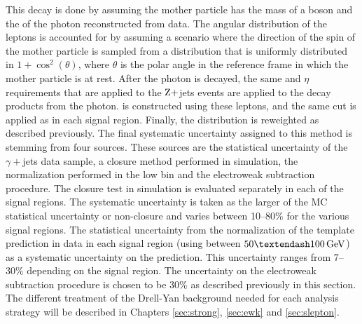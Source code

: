 This decay is done by assuming the mother particle has the mass of a \PZ boson and the \pt of the photon reconstructed from data. 
The angular distribution of the leptons is accounted for by assuming a scenario where the direction of the spin of the mother particle is sampled from a distribution that is uniformly distributed in $1+\cos^{2}(\theta)$, where $\theta$ is the polar angle in the reference frame in which the mother particle is at rest. 
After the photon is decayed, the same \pt and $\eta$ requirements that are applied to the $\mathrm{Z}+$jets events are applied to the decay products from the photon. 
\mttwol is constructed using these leptons, and the same cut is applied as in each signal region. 
Finally, the \pt distribution is reweighted as described previously.
The final systematic uncertainty assigned to this method is stemming from four sources. 
These sources are the statistical uncertainty of the $\gamma+$jets data sample, a closure method performed in simulation, the normalization performed in the low \ptmiss bin and the electroweak subtraction procedure. 
The closure test in simulation is evaluated separately in each of the signal regions. 
The systematic uncertainty is taken as the larger of the MC statistical uncertainty or non-closure and varies between 10–80\% for the various signal regions.
The statistical uncertainty from the normalization of the template prediction in data in each signal region (using \ptmiss between $50–100\GeV$) as a systematic uncertainty on the prediction. 
This uncertainty ranges from 7–30\% depending on the signal region.
The uncertainty on the electroweak subtraction procedure is chosen to be 30\% as described previously in this section. 
The different treatment of the Drell-Yan background needed for each analysis strategy will be described in Chapters \ref{sec:strong}, \ref{sec:ewk} and \ref{sec:slepton}.   
